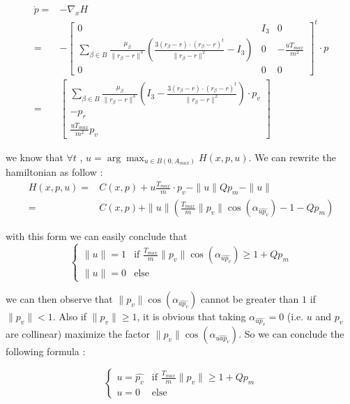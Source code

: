 \documentclass[11pt]{article} %
\begin{document}
			$$
			\begin{align}
				\dot{p}=&-\nabla _{x}H\\
				=&-\begin{bmatrix}
					0 & I_3 & 0\\
					\sum\limits _{\beta \in B }\frac{\mu _{\beta }}{\| r_{\beta } -r\| ^{3}}\left(\frac{3( r_{\beta } -r) \cdot ( r_{\beta } -r)^{t}}{\| r_{\beta } -r\| ^{2}} -I_3\right) & 0 & -\frac{uT_ {max}}{m^2} \\
					0 & 0 & 0
				\end{bmatrix}^{t} \cdot p\\
				=&\begin{bmatrix}
					\sum\limits _{\beta \in B }\frac{\mu _{\beta }}{\| r_{\beta } -r\| ^{3}}\left(I_3-\frac{3( r_{\beta } -r) \cdot ( r_{\beta } -r)^{t}}{\| r_{\beta } -r\| ^{2}} \right)\cdot p_v\\
					-p_r\\
					\frac{uT_ {max}}{m^2}p_v
				\end{bmatrix}
			\end{align}
			$$
			
			we know that $\forall t$ , $u=\arg\max_{u\in B(0,A_{max})}H(x,p,u)$. We can rewrite the hamiltonian as follow : 
			$$
			\begin{align}
				H(x,p,u)=&C(x,p)+u\frac{T_ {max}}{m}\cdot p_v-\|u\|Qp_m-\|u\| \\
				=&C(x,p)+\|u\|(\frac{T_ {max}}{m}\|p_v\|\cos(\alpha_{\widehat{up_v}})-1-Qp_m)
			\end{align}
			$$ 
			
			with this form we can easily conclude that 
			$$
			\begin{cases}
				\| u\| =1 & \text{if } \frac{T_ {max}}{m}\|p_v\|\cos(\alpha_{\widehat{up_v}})\ge1+Qp_m\\
				\| u\| =0 & \text{else}
			\end{cases}
			$$
			
			we can then observe that $\|p_v\|\cos(\alpha_{\widehat{ap_v}})$ cannot be greater than $1$ if $\|p_v\| < 1$. Also if $\|p_v\| \ge 1$, it is obvious that taking $\alpha_{\widehat{up_v}}=0$ (i.e. $u$ and $p_v$ are collinear) maximize the factor $\|p_v\|\cos(\alpha_{\widehat{uap_v}})$. So we can conclude the following formula :
			
			$$
			\begin{cases}
				 u =\widehat{p_v} & \text{if }\frac{T_ {max}}{m}\|p_v\| \ge 1+Qp_m\\
				 u =0 & \text{else}
			\end{cases}
			$$
			
\end{document}
